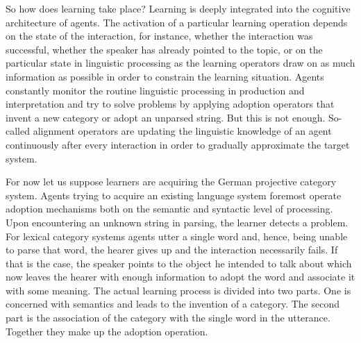 So how does learning take place? Learning is deeply integrated into the cognitive architecture 
of agents. The activation of a particular learning operation depends on the state of the interaction, 
for instance, whether the interaction was successful, whether the speaker has already pointed to the topic,
or on the particular state in linguistic processing as the learning operators draw on as 
much information as possible in order to constrain the learning situation. 
Agents constantly monitor the routine linguistic processing in production and interpretation 
and try to solve problems by applying adoption operators that invent a new category or adopt 
an unparsed string.  But this is not enough. So-called alignment operators are 
updating the linguistic knowledge of an agent continuously after every interaction
in order to gradually approximate the target system.

For now let us suppose learners are acquiring the German projective category system. 
Agents trying to acquire an existing language system 
foremost operate adoption mechanisms both on the 
semantic and syntactic level of processing. Upon encountering an unknown 
string in parsing, the learner detects a problem. For lexical category systems
agents utter a single word and, hence, being unable to parse that
word, the hearer gives up and the interaction necessarily fails. 
If that is the case, the speaker points to the object he intended to talk about 
which now leaves the hearer with enough information to adopt the word 
and associate it with some meaning. The actual learning process is divided into two parts. 
One is concerned with semantics and leads to the invention of a category. 
The second part is the association of the category with the single word in 
the utterance. Together they make up the adoption operation.

